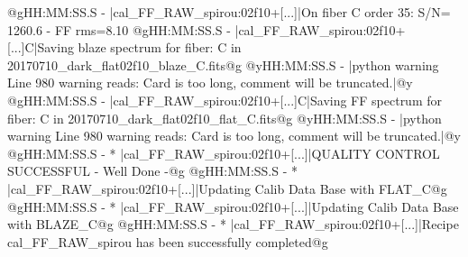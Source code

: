 \begin{cmdboxprintspecial}[fontupper=\tiny, fontlower=\tiny]
@gHH:MM:SS.S -   |cal_FF_RAW_spirou:02f10+[...]|On fiber C order 35: S/N= 1260.6  - FF rms=8.10 %
@gHH:MM:SS.S -   |cal_FF_RAW_spirou:02f10+[...]C|Saving blaze spectrum for fiber: C in 20170710_dark_flat02f10_blaze_C.fits@g
@yHH:MM:SS.S - \@ |python warning Line 980  warning reads: Card is too long, comment will be truncated.|@y
@gHH:MM:SS.S -   |cal_FF_RAW_spirou:02f10+[...]C|Saving FF spectrum for fiber: C in 20170710_dark_flat02f10_flat_C.fits@g
@yHH:MM:SS.S - \@ |python warning Line 980  warning reads: Card is too long, comment will be truncated.|@y
@gHH:MM:SS.S - * |cal_FF_RAW_spirou:02f10+[...]|QUALITY CONTROL SUCCESSFUL - Well Done -@g
@gHH:MM:SS.S - * |cal_FF_RAW_spirou:02f10+[...]|Updating Calib Data Base with FLAT_C@g
@gHH:MM:SS.S - * |cal_FF_RAW_spirou:02f10+[...]|Updating Calib Data Base with BLAZE_C@g
@gHH:MM:SS.S - * |cal_FF_RAW_spirou:02f10+[...]|Recipe cal_FF_RAW_spirou has been successfully completed@g

\end{cmdboxprintspecial}







